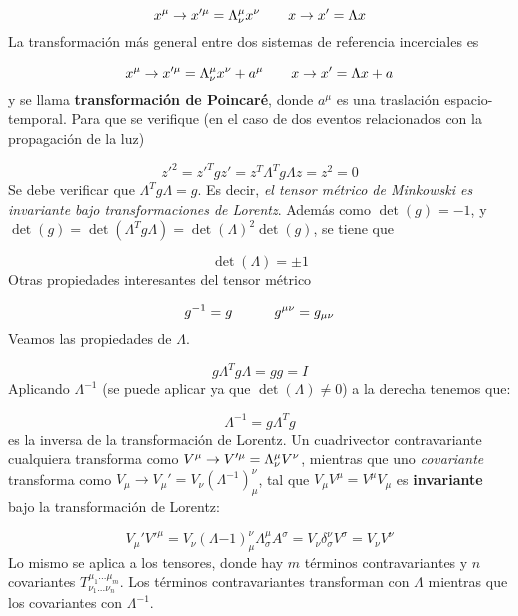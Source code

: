 \begin{equation}
	x^\mu \rightarrow x'^\mu = \Lambda^\mu_\nu x^\nu \qquad x\rightarrow x' = \Lambda x
\end{equation}
La transformación más general entre dos sistemas de referencia incerciales es

\begin{equation}
		x^\mu \rightarrow x'^\mu = \Lambda^\mu_\nu x^\nu +a^\mu \qquad x\rightarrow x' = \Lambda x +a
\end{equation}
y se llama \textbf{transformación de Poincaré}, donde $a^\mu$ es una traslación espacio-temporal. Para que se verifique (en el caso de dos eventos relacionados con la propagación de la luz)

\begin{equation}
	z'^2 = z'^T g z' = z^T \Lambda^T g \Lambda z = z^2 = 0
\end{equation}
Se debe verificar que $\Lambda^T g \Lambda = g$. Es decir, \textit{el tensor métrico de Minkowski es invariante bajo transformaciones de Lorentz}. Además como $\det(g)=-1$, y $\det(g)=\det(\Lambda^Tg\Lambda)= \det(\Lambda)^2\det(g)$, se tiene que 

\begin{equation}
	\det (\Lambda) = \pm 1
\end{equation}
Otras propiedades interesantes del tensor métrico

\begin{equation}
	g^{-1} = g \quad \quad \quad g^{\mu \nu} = g_{\mu \nu}
\end{equation}
Veamos las propiedades de $\Lambda$.

\begin{equation}
	g\Lambda^T g \Lambda = gg = I
\end{equation}
Aplicando $\Lambda^{-1}$ (se puede aplicar ya que $\det(\Lambda)\neq 0$) a la derecha tenemos que:

\begin{equation}
	\Lambda^{-1} = g\Lambda^T g
\end{equation}
es la inversa de la transformación de Lorentz. Un cuadrivector contravariante cualquiera transforma como $V^\mu \rightarrow V'^\mu = \Lambda^\mu_\nu V^\nu$, mientras que uno \textit{covariante} transforma como $V_\mu \rightarrow V_\mu ' = V_\nu (\Lambda^{-1})_\mu^\nu$, tal que $V_\mu V^\mu= V^\mu V_\mu$ es \textbf{invariante} bajo la transformación de Lorentz:

\begin{equation}
	V_\mu'V'^\mu = V_\nu (\Lambda{-1})_{\mu}^\nu \Lambda_\sigma^\mu A^\sigma = V_\nu \delta^\nu_\sigma V^\sigma = V_\nu V^\nu
\end{equation}
Lo mismo se aplica a los tensores, donde hay $m$ términos contravariantes y $n$ covariantes $T^{\mu_1...\mu_m}_{\nu_1...\nu_n}$. Los términos contravariantes transforman con $\Lambda$ mientras que los covariantes con $\Lambda^{-1}$. 

